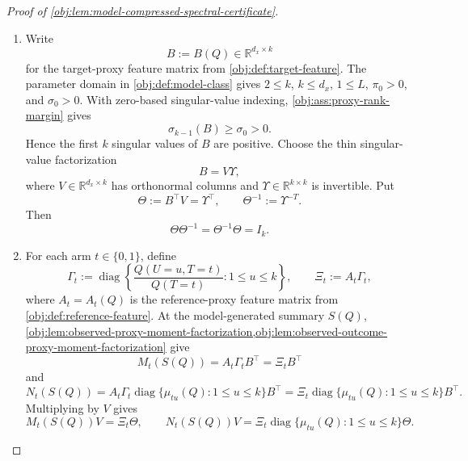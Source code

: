 \begin{proof}[Proof of \cref{obj:lem:model-compressed-spectral-certificate}]
\begin{enumerate}
\item
Write
\[
B:=B(Q)\in\mathbb R^{d_x\times k}
\]
for the target-proxy feature matrix from \cref{obj:def:target-feature}.  The parameter domain in \cref{obj:def:model-class} gives \(2\le k\), \(k\le d_x\), \(1\le L\), \(\pi_0>0\), and \(\sigma_0>0\).  With zero-based singular-value indexing, \cref{obj:ass:proxy-rank-margin} gives
\[
\sigma_{k-1}(B)\ge \sigma_0>0 .
\]
Hence the first \(k\) singular values of \(B\) are positive.  Choose the thin singular-value factorization
\[
B=V\Upsilon ,
\]
where \(V\in\mathbb R^{d_x\times k}\) has orthonormal columns and \(\Upsilon\in\mathbb R^{k\times k}\) is invertible.  Put
\[
\Theta:=B^\top V=\Upsilon^\top,
\qquad
\Theta^{-1}:=\Upsilon^{-T}.
\]
Then
\[
\Theta\Theta^{-1}=\Theta^{-1}\Theta=I_k .
\]

\item
For each arm \(t\in\{0,1\}\), define
\[
\Gamma_t
:=
\operatorname{diag}\left\{
\frac{Q(U=u,T=t)}{Q(T=t)}:1\le u\le k
\right\},
\qquad
\Xi_t:=A_t\Gamma_t ,
\]
where \(A_t=A_t(Q)\) is the reference-proxy feature matrix from \cref{obj:def:reference-feature}.  At the model-generated summary \(S(Q)\), \cref{obj:lem:observed-proxy-moment-factorization,obj:lem:observed-outcome-proxy-moment-factorization} give
\[
M_t(S(Q))=A_t\Gamma_tB^\top=\Xi_tB^\top
\]
and
\[
N_t(S(Q))
=
A_t\Gamma_t\operatorname{diag}\{\mu_{tu}(Q):1\le u\le k\}B^\top
=
\Xi_t\operatorname{diag}\{\mu_{tu}(Q):1\le u\le k\}B^\top .
\]
Multiplying by \(V\) gives
\[
M_t(S(Q))V=\Xi_t\Theta,
\qquad
N_t(S(Q))V
=
\Xi_t\operatorname{diag}\{\mu_{tu}(Q):1\le u\le k\}\Theta .
\]


\end{enumerate}
\end{proof}
